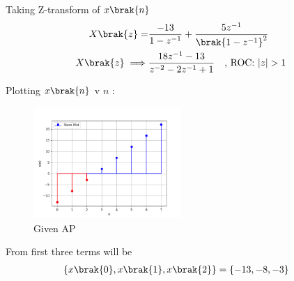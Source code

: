 \documentclass[journal,12pt,twocolumn]{IEEEtran}
\begin{document}
Taking Z-transform of $x\brak{n}$
\begin{align}
X\brak{z} = & \frac{-13}{1 - z^{-1}} + \frac{ 5z^{-1}}{\brak{1 - z^{-1}}^2}\\
X\brak{z}\implies & \frac{18z^{-1} - 13}{z^{-2} - 2z^{-1} + 1} \quad \text{, ROC: } |z| > 1 
\end{align}

\pagebreak

Plotting $x\brak{n}$ v $n$ :
\begin{figure}[h]
    \includegraphics[width=0.5\textwidth]{ncert-maths/10/5/2/18/figs/fig1.png}
    \caption{Given AP}
    \label{fig:10.5.2.18.1}
\end{figure}

From  first three terms will be
\begin{align}
\{x\brak{0},x\brak{1},x\brak{2}\} &= \{-13 , -8 , -3\}
\end{align}















\end{document}
